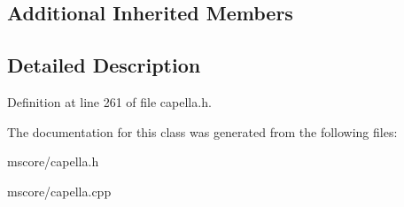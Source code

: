 \subsection*{Additional Inherited Members}


\subsection{Detailed Description}


Definition at line 261 of file capella.\+h.



The documentation for this class was generated from the following files\+:\begin{DoxyCompactItemize}
\item 
mscore/capella.\+h\item 
mscore/capella.\+cpp\end{DoxyCompactItemize}
